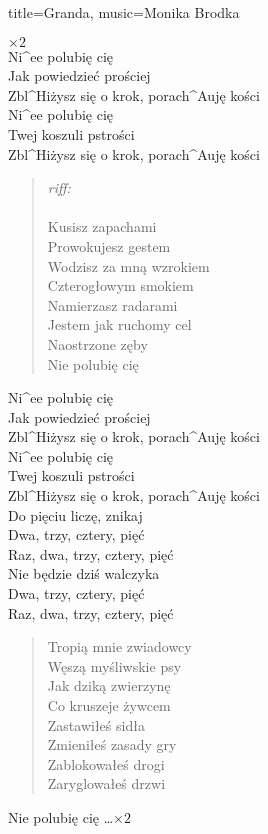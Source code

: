 \newpage
\begin{song}{title={Granda}, music={Monika Brodka}}
	\begin{intro}
	    $\times 2$ \\
		Ni^{e}e polubię cię \\
		Jak powiedzieć prościej \\
		Zbl^{H}iżysz się o krok, porach^{A}uję kości \\
		Ni^{e}e polubię cię \\
		Twej koszuli pstrości \\
		Zbl^{H}iżysz się o krok, porach^{A}uję kości
	\end{intro}
	\begin{verse}
		\textit{riff:}     \\	\\
		Kusisz zapachami \\
		Prowokujesz gestem \\
		Wodzisz za mną wzrokiem \\
		Czterogłowym smokiem \\
		Namierzasz radarami \\
		Jestem jak ruchomy cel \\
		Naostrzone zęby \\ 
		Nie polubię cię 
	\end{verse}
	\begin{chorus}
		Ni^{e}e polubię cię \\
		Jak powiedzieć prościej \\
		Zbl^{H}iżysz się o krok, porach^{A}uję kości \\
		Ni^{e}e polubię cię \\
		Twej koszuli pstrości \\
		Zbl^{H}iżysz się o krok, porach^{A}uję kości \\
		Do pięciu liczę, znikaj \\
		Dwa, trzy, cztery, pięć \\ 
		Raz, dwa, trzy, cztery, pięć \\
		Nie będzie dziś walczyka \\ 
		Dwa, trzy, cztery, pięć \\
		Raz, dwa, trzy, cztery, pięć \\
	\end{chorus}
	\begin{verse}
		Tropią mnie zwiadowcy \\
		Węszą myśliwskie psy \\
		Jak dziką zwierzynę \\
		Co kruszeje żywcem \\
		Zastawiłeś sidła \\
		Zmieniłeś zasady gry \\ 
		Zablokowałeś drogi \\
		Zaryglowałeś drzwi
	\end{verse}
	\begin{chorus}
		Nie polubię cię \ldots $\times 2$
	\end{chorus}
\end{song}

